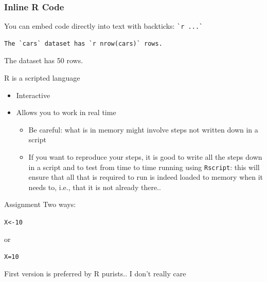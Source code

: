 \documentclass[aspectratio=169]{beamer}\usepackage[]{graphicx}\usepackage[]{xcolor}
\makeatletter
\newcommand{\hlnum}[1]{\textcolor[rgb]{0.686,0.059,0.569}{#1}}%
\newcommand{\hldef}[1]{\textcolor[rgb]{0.345,0.345,0.345}{#1}}%
\newcommand{\hlkwb}[1]{\textcolor[rgb]{0.69,0.353,0.396}{#1}}%
\newenvironment{kframe}{%
 \def\at@end@of@kframe{}%
 \ifinner\ifhmode%
  \def\at@end@of@kframe{\end{minipage}}%
  \begin{minipage}{\columnwidth}%
 \fi\fi%
 \def\FrameCommand##1{\hskip\@totalleftmargin \hskip-\fboxsep
 \colorbox{shadecolor}{##1}\hskip-\fboxsep
     \hskip-\linewidth \hskip-\@totalleftmargin \hskip\columnwidth}%
 \MakeFramed {\advance\hsize-\width
   \@totalleftmargin\z@ \linewidth\hsize
   \@setminipage}}%
 {\par\unskip\endMakeFramed%
 \at@end@of@kframe}
\newenvironment{knitrout}{}{} %
\makeatother
\begin{document}
\begin{frame}[fragile]
  \frametitle{Inline R Code}
  You can embed  code directly into text with backticks: \verb|`r ...`|
  \vfill
\begin{lstlisting}
The `cars` dataset has `r nrow(cars)` rows.
\end{lstlisting}
  \vfill
  The  dataset has 50 rows.
\end{frame}


\begin{frame}{R is a scripted language}
\begin{itemize}
\item Interactive
\vfill
\item Allows you to work in real time
\vfill
    \begin{itemize}
    \item Be careful: what is in memory might involve steps not written down in a script
    \vfill
    \item If you want to reproduce your steps, it is good to write all the steps down in a script and to test from time to time running using \texttt{Rscript}: this will ensure that all that is required to run is indeed loaded to memory when it needs to, i.e., that it is not already there..
    \end{itemize}
\end{itemize}
\end{frame}


\begin{frame}{Assignment}
Two ways:

\begin{knitrout}
\color{fgcolor}\begin{kframe}
\begin{alltt}
\hldef{X} \hlkwb{<-} \hlnum{10}
\end{alltt}
\end{kframe}
\end{knitrout}

or

\begin{knitrout}
\color{fgcolor}\begin{kframe}
\begin{alltt}
\hldef{X} \hlkwb{=} \hlnum{10}
\end{alltt}
\end{kframe}
\end{knitrout}

First version is preferred by R purists.. I don't really care
\end{frame}
\end{document}

